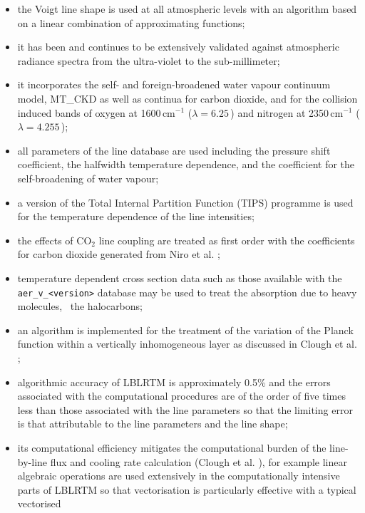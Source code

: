 \begin{itemize}
  \item the Voigt line shape is used at all atmospheric levels with an
    algorithm based on a linear combination of approximating functions;
  \item it has been and continues to be extensively validated against
    atmospheric radiance spectra from the ultra-violet to the
    sub-millimeter;
  \item it incorporates the self- and foreign-broadened water vapour continuum
    model, MT\_CKD as well as continua for carbon dioxide, and for the
    collision induced bands of oxygen at 1600\,cm$^{-1}$ ($\lambda=6.25$\,\mum)
    and nitrogen at 2350\,cm$^{-1}$ ($\lambda=4.255$\,\mum);
  \item all parameters of the line database are used including the
    pressure shift coefficient, the halfwidth temperature dependence, and the
    coefficient for the self-broadening of water vapour;
  \item a version of the Total Internal Partition Function (TIPS) programme is
    used for the temperature dependence of the line intensities;
  \item the effects of CO$_2$ line coupling are treated as first order with
    the coefficients for carbon dioxide generated from Niro et al.
    \cite{NIR05};
  \item temperature dependent cross section data such as those available with
    the {\tt aer\_v\_<version>} database may be used to treat the absorption
    due to heavy molecules, \eg\ the halocarbons;
  \item an algorithm is implemented for the treatment of the variation of the
    Planck function within a vertically inhomogeneous layer as discussed in
    Clough et al. \cite{CLO92};
  \item algorithmic accuracy of \ac{LBLRTM} is approximately 0.5\% and the
    errors associated with the computational procedures are of the order of
    five times less than those associated with the line parameters so that the
    limiting error is that attributable to the line parameters and the line
    shape;
  \item its computational efficiency mitigates the computational burden of the
    line-by-line flux and cooling rate calculation (Clough et al.
    \cite{CLO92}), for example linear algebraic operations are used
    extensively in the computationally intensive parts of \ac{LBLRTM} so that
    vectorisation is particularly effective with a typical vectorised

\end{itemize}
